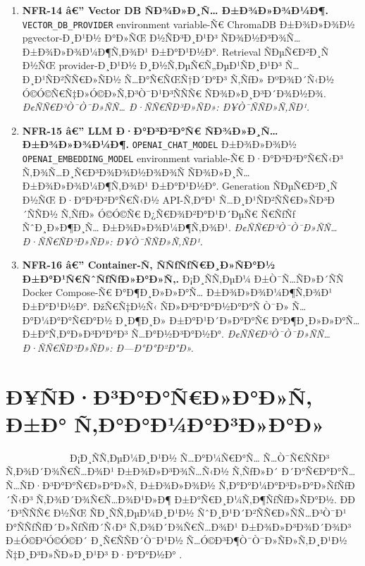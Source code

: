 \documentclass[12pt,A4]{report}
\begin{document}
\begin{enumerate}

  \item \textbf{NFR-14 â€” Vector DB ÑÐ¾Ð»Ð¸Ñ… Ð±Ð¾Ð»Ð¾Ð¼Ð¶.}
        \texttt{VECTOR\_DB\_PROVIDER} environment
        variable-Ñ€ ChromaDB Ð±Ð¾Ð»Ð¾Ð½ pgvector-Ð¸Ð¹Ð½ Ð°Ð»ÑŒ
        Ð½ÑÐ³Ð¸Ð¹Ð³ ÑÐ¾Ð½Ð³Ð¾Ñ… Ð±Ð¾Ð»Ð¾Ð¼Ð¶Ñ‚Ð¾Ð¹ Ð±Ð°Ð¹Ð½Ð°. Retrieval
        ÑÐµÑ€Ð²Ð¸Ñ Ð½ÑŒ provider-Ð¸Ð¹Ð½ Ð¸Ð½Ñ‚ÐµÑ€Ñ„ÐµÐ¹ÑÐ¸Ð¹Ð³ Ñ…Ð¸Ð¹ÑÐ²ÑÑ€Ð»ÑÐ½
        Ñ…Ð°Ñ€ÑŒÑ†Ð´Ð°Ð³ Ñ‚ÑƒÐ» ÐºÐ¾Ð´Ñ‹Ð½ Ó©Ó©Ñ€Ñ‡Ð»Ó©Ð»Ñ‚Ð³Ò¯Ð¹Ð³ÑÑÑ€ ÑÐ¾Ð»Ð¸Ð³Ð´Ð¾Ð½Ð¾.
        \textit{Ð¢ÑÑ€Ð³Ò¯Ò¯Ð»ÑÑ… Ð·ÑÑ€ÑÐ³Ð»ÑÐ»: Ð¥Ò¯ÑÑÐ»Ñ‚ÑÐ¹.}

  \item \textbf{NFR-15 â€” LLM Ð·Ð°Ð³Ð²Ð°Ñ€ ÑÐ¾Ð»Ð¸Ñ… Ð±Ð¾Ð»Ð¾Ð¼Ð¶.}
        \texttt{OPENAI\_CHAT\_MODEL} Ð±Ð¾Ð»Ð¾Ð½
        \texttt{OPENAI\_EMBEDDING\_MODEL} environment
        variable-Ñ€ Ð·Ð°Ð³Ð²Ð°Ñ€Ñ‹Ð³ Ñ‚Ð¾Ñ…Ð¸Ñ€Ð³Ð¾Ð¾Ð½Ð¾Ð¾Ñ ÑÐ¾Ð»Ð¸Ñ… Ð±Ð¾Ð»Ð¾Ð¼Ð¶Ñ‚Ð¾Ð¹
        Ð±Ð°Ð¹Ð½Ð°. Generation ÑÐµÑ€Ð²Ð¸Ñ Ð½ÑŒ Ð·Ð°Ð³Ð²Ð°Ñ€Ñ‹Ð½ API-Ñ‚Ð°Ð¹
        Ñ…Ð¸Ð¹ÑÐ²ÑÑ€Ð»ÑÐ³Ð´ÑÑÐ½ Ñ‚ÑƒÐ» Ó©Ó©Ñ€ Ð¿Ñ€Ð¾Ð²Ð°Ð¹Ð´ÐµÑ€ Ñ€ÑƒÑƒ ÑˆÐ¸Ð»Ð¶Ð¸Ñ…
        Ð±Ð¾Ð»Ð¾Ð¼Ð¶Ñ‚Ð¾Ð¹.
        \textit{Ð¢ÑÑ€Ð³Ò¯Ò¯Ð»ÑÑ… Ð·ÑÑ€ÑÐ³Ð»ÑÐ»: Ð¥Ò¯ÑÑÐ»Ñ‚ÑÐ¹.}

  \item \textbf{NFR-16 â€” Container-Ñ‚ ÑÑƒÑƒÑ€Ð¸Ð»ÑÐ°Ð½
        Ð±Ð°Ð¹Ñ€ÑˆÑƒÑƒÐ»Ð°Ð»Ñ‚.}
        Ð¡Ð¸ÑÑ‚ÐµÐ¼ Ð±Ò¯Ñ…ÑÐ»Ð´ÑÑ Docker Compose-Ñ€ Ð°Ð¶Ð¸Ð»Ð»Ð°Ñ…
        Ð±Ð¾Ð»Ð¾Ð¼Ð¶Ñ‚Ð¾Ð¹ Ð±Ð°Ð¹Ð½Ð°. ÐžÑ€Ñ‡Ð½Ñ‹ ÑÐ»Ð³Ð°Ð°Ð½Ð°Ð°Ñ Ò¯Ð» Ñ…Ð°Ð¼Ð°Ð°Ñ€Ð°Ð½
        Ð¸Ð¶Ð¸Ð» Ð±Ð°Ð¹Ð´Ð»Ð°Ð°Ñ€ Ð°Ð¶Ð¸Ð»Ð»Ð°Ñ… Ð±Ð°Ñ‚Ð°Ð»Ð³Ð°Ð°Ð³ Ñ…Ð°Ð½Ð³Ð°Ð½Ð°.
        \textit{Ð¢ÑÑ€Ð³Ò¯Ò¯Ð»ÑÑ… Ð·ÑÑ€ÑÐ³Ð»ÑÐ»: Ð—Ð°Ð°Ð²Ð°Ð».}

\end{enumerate}

\section{Ð¥ÑÐ·Ð³Ð°Ð°Ñ€Ð»Ð°Ð»Ñ‚ Ð±Ð° Ñ‚Ð°Ð°Ð¼Ð°Ð³Ð»Ð°Ð»}

\ \ \ \ \ \ \ \ \  \ \ \ \ Ð¡Ð¸ÑÑ‚ÐµÐ¼Ð¸Ð¹Ð½ Ñ…Ð°Ð¼Ñ€Ð°Ñ… Ñ…Ò¯Ñ€ÑÑÐ³ Ñ‚Ð¾Ð´Ð¾Ñ€Ñ…Ð¾Ð¹
Ð±Ð¾Ð»Ð³Ð¾Ñ…Ñ‹Ð½ Ñ‚ÑƒÐ»Ð´ Ð´Ð°Ñ€Ð°Ð°Ñ… Ñ…ÑÐ·Ð³Ð°Ð°Ñ€Ð»Ð°Ð»Ñ‚ Ð±Ð¾Ð»Ð¾Ð½ Ñ‚Ð°Ð°Ð¼Ð°Ð³Ð»Ð°Ð»ÑƒÑƒÐ´Ñ‹Ð³
Ñ‚Ð¾Ð´Ð¾Ñ€Ñ…Ð¾Ð¹Ð»Ð¶ Ð±Ð°Ñ€Ð¸Ð¼Ñ‚Ð¶ÑƒÑƒÐ»ÑÐ°Ð½. Ð­Ð´Ð³ÑÑÑ€ Ð½ÑŒ ÑÐ¸ÑÑ‚ÐµÐ¼Ð¸Ð¹Ð½ ÑˆÐ¸Ð¹Ð´Ð²ÑÑ€Ð»ÑÑ…Ð³Ò¯Ð¹
Ð°ÑÑƒÑƒÐ´Ð»ÑƒÑƒÐ´Ñ‹Ð³ Ñ‚Ð¾Ð´Ð¾Ñ€Ñ…Ð¾Ð¹ Ð±Ð¾Ð»Ð³Ð¾Ð´Ð¾Ð³ Ð±Ó©Ð³Ó©Ó©Ð´ Ð¸Ñ€ÑÑÐ´Ò¯Ð¹Ð½ Ñ…Ó©Ð³Ð¶Ò¯Ò¯Ð»ÑÐ»Ñ‚Ð¸Ð¹Ð½
Ñ‡Ð¸Ð³Ð»ÑÐ»Ð¸Ð¹Ð³ Ð·Ð°Ð°Ð½Ð° \cite{hull2011requirements}.
\end{document}

